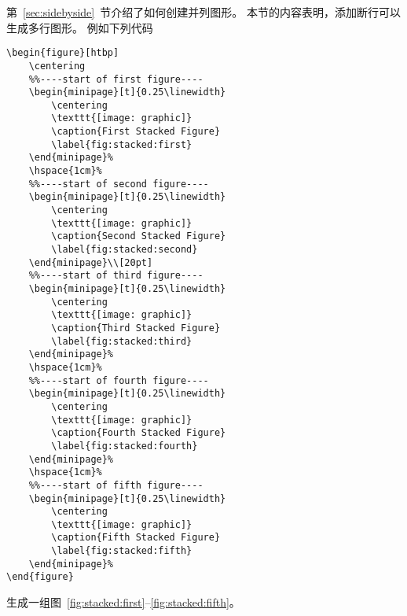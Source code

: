 第~\ref{sec:sidebyside}~节介绍了如何创建并列图形。
本节的内容表明，添加断行可以生成多行图形。
例如下列代码
\begin{lstlisting}
\begin{figure}[htbp]
	\centering
	%%----start of first figure----
	\begin{minipage}[t]{0.25\linewidth}
		\centering
		\texttt{[image: graphic]}
		\caption{First Stacked Figure}
		\label{fig:stacked:first}
	\end{minipage}%
	\hspace{1cm}%
	%%----start of second figure----
	\begin{minipage}[t]{0.25\linewidth}
		\centering
		\texttt{[image: graphic]}
		\caption{Second Stacked Figure}
		\label{fig:stacked:second}
	\end{minipage}\\[20pt]
	%%----start of third figure----
	\begin{minipage}[t]{0.25\linewidth}
		\centering
		\texttt{[image: graphic]}
		\caption{Third Stacked Figure}
		\label{fig:stacked:third}
	\end{minipage}%
	\hspace{1cm}%
	%%----start of fourth figure----
	\begin{minipage}[t]{0.25\linewidth}
		\centering
		\texttt{[image: graphic]}
		\caption{Fourth Stacked Figure}
		\label{fig:stacked:fourth}
	\end{minipage}%
	\hspace{1cm}%
	%%----start of fifth figure----
	\begin{minipage}[t]{0.25\linewidth}
		\centering
		\texttt{[image: graphic]}
		\caption{Fifth Stacked Figure}
		\label{fig:stacked:fifth}
	\end{minipage}%
\end{figure}
\end{lstlisting}
生成一组图~\ref{fig:stacked:first}--\ref{fig:stacked:fifth}。

